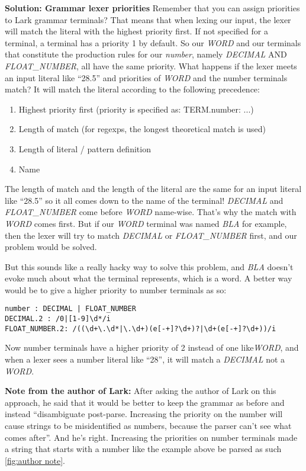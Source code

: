\documentclass[12pt]{article}
\begin{document}
\textbf{Solution: Grammar lexer priorities
}
Remember that you can assign priorities to Lark grammar terminals? That means that when lexing our input, the lexer will match the literal with the highest priority first. If not specified for a terminal, a terminal has a priority 1 by default. So our \emph{WORD} and our terminals that constitute the production rules for our \emph{number}, namely \emph{DECIMAL} AND \emph{FLOAT\_NUMBER}, all have the same priority. What happens if the lexer meets an input literal like “28.5” and priorities of \emph{WORD} and the number terminals match? It will match the literal according to the following precedence:
\begin{enumerate}
    \item Highest priority first (priority is specified as: TERM.number: ...)
    \item Length of match (for regexps, the longest theoretical match is used)
    \item Length of literal / pattern definition
    \item Name
\end{enumerate}
The length of match and the length of the literal are the same for an input literal like “28.5” so it all comes down to the name of the terminal! \emph{DECIMAL} and \emph{FLOAT\_NUMBER} come before \emph{WORD} name-wise. That’s why the match with \emph{WORD} comes first. But if our \emph{WORD} terminal was named \emph{BLA} for example, then the lexer will try to match \emph{DECIMAL} or \emph{FLOAT\_NUMBER} first, and our problem would be solved.

But this sounds like a really hacky way to solve this problem, and \emph{BLA} doesn’t evoke much about what the terminal represents, which is a word. A better way would be to give a higher priority to number terminals as so:
\begin{lstlisting}
number : DECIMAL | FLOAT_NUMBER
DECIMAL.2 : /0|[1-9]\d*/i
FLOAT_NUMBER.2: /((\d+\.\d*|\.\d+)(e[-+]?\d+)?|\d+(e[-+]?\d+))/i
\end{lstlisting}

Now number terminals have a higher priority of 2 instead of one like\emph{WORD}, and when a lexer sees a number literal like “28”, it will match a \emph{DECIMAL} not a \emph{WORD}.

\textbf{Note from the author of Lark:} After asking the author of Lark on this approach, he said that it would be better to keep the grammar as before and instead “disambiguate post-parse. Increasing the priority on the number will cause strings to be misidentified as numbers, because the parser can't see what comes after”. And he’s right. Increasing the priorities on number terminals made a string that starts with a number like the example above be parsed as such \ref{fig:author note}.
\end{document}
